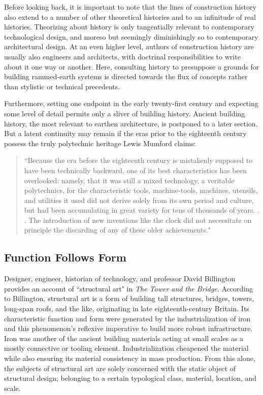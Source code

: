 \clearpage

Before looking back, it is important to note that the lines of construction history also extend to a number of other theoretical histories and to an infinitude of real histories. Theorizing about history is only tangentially relevant to contemporary technological design, and moreso but seemingly diminishingly so to contemporary architectural design. At an even higher level, authors of construction history are usually also engineers and architects, with doctrinal responsibilities to write about it one way or another. \cite[p14]{CONSHISTORY} Here, consulting history to presuppose a grounds for building rammed-earth systems is directed towards the flux of concepts rather than stylistic or technical precedents.

Furthermore, setting one endpoint in the early twenty-first century and expecting some level of detail permits only a sliver of building history. Ancient building history, the most relevant to earthen architecture, is postponed to a later section. But a latent continuity may remain if the eras prior to the eighteenth century possess the truly polytechnic heritage Lewis Mumford claims:

\begin{quote}
\small{
``Because the era before the eighteenth century is mistakenly supposed to have been technically backward, one of its best characteristics has been overlooked: namely, that it was still a mixed technology, a veritable polytechnics, for the characteristic tools, machine-tools, machines, utensils, and utilities it used did not derive solely from its own period and culture, but had been accumulating in great variety for tens of thousands of years. . . The introduction of new inventions like the clock did not necessitate on principle the discarding of any of these older achievements."} \cite[p134]{MYTHMACHINE}
\end{quote}

\subsection{Function Follows Form}

Designer, engineer, historian of technology, and professor David Billington provides an account of ``structural art" in \textit{The Tower and the Bridge}. According to Billington, structural art is a form of building tall structures, bridges, towers, long-span roofs, and the like, originating in late eighteenth-century Britain. Its characteristic function and form were generated by the industrialization of iron and this phenomenon's reflexive imperative to build more robust infrastructure. \cite[p7]{TOWERANDBRIDGE} Iron was another of the ancient building materials acting at small scales as a mostly connective or tooling element. Industrialization cheapened the material while also ensuring its material consistency in mass production. \cite{IRON} From this alone, the subjects of structural art are solely concerned with the static object of structural design; belonging to a certain typological class, material, location, and scale.


